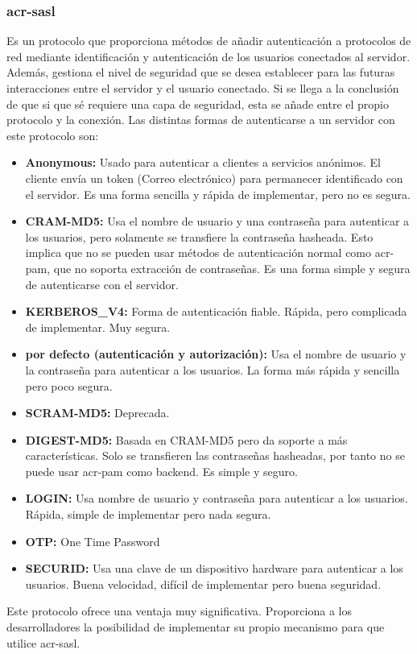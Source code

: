 \documentclass[titlepage, 12pt, a4paper]{article}
\begin{document}
\subsubsection{\gls{acr-sasl}}
Es un protocolo que proporciona métodos de añadir autenticación a protocolos de red mediante identificación y autenticación de los usuarios conectados al servidor. Además, gestiona el nivel de seguridad que se desea establecer para las futuras interacciones entre el servidor y el usuario conectado. Si se llega a la conclusión de que si que sé requiere una capa de seguridad, esta se añade entre el propio protocolo y la conexión.\cite{rfc2222} 
Las distintas formas de autenticarse a un servidor con este protocolo son:
\begin{itemize}
	\item{\textbf{Anonymous: }}Usado para autenticar a clientes a servicios anónimos. El cliente envía un token (Correo electrónico) para permanecer identificado con el servidor. Es una forma sencilla y rápida de implementar, pero no es segura.
	\item{\textbf{CRAM-MD5: }}Usa el nombre de usuario y una contraseña para autenticar a los usuarios, pero solamente se transfiere la contraseña hasheada. Esto implica que no se pueden usar métodos de autenticación normal como \gls{acr-pam}, que no soporta extracción de contraseñas. Es una forma simple y segura de autenticarse con el servidor.
	\item{\textbf{KERBEROS\_V4: }}Forma de autenticación fiable. Rápida, pero complicada de implementar. Muy segura.
	\item{\textbf{por defecto (autenticación y autorización): }}Usa el nombre de usuario y la contraseña para autenticar a los usuarios. La forma más rápida y sencilla pero poco segura.
	\item{\textbf{SCRAM-MD5: }}Deprecada.
	\item{\textbf{DIGEST-MD5: }}Basada en CRAM-MD5 pero da soporte a más características. Solo se transfieren las contraseñas hasheadas, por tanto no se puede usar \gls{acr-pam} como backend. Es simple y seguro.
	\item{\textbf{LOGIN: }}Usa nombre de usuario y contraseña para autenticar a los usuarios. Rápida, simple de implementar pero nada segura.
	\item{\textbf{OTP: }}One Time Password
	\item{\textbf{SECURID: }}Usa una clave de un dispositivo hardware para autenticar a los usuarios. Buena velocidad, difícil de implementar pero buena seguridad.
\end{itemize}
Este protocolo ofrece una ventaja muy significativa. Proporciona a los desarrolladores la posibilidad de implementar su propio mecanismo para que utilice \gls{acr-sasl}.
\end{document}
